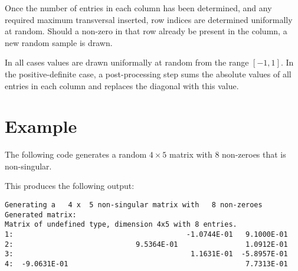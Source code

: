 Once the number of entries in each column has been determined, and any required
maximum transversal inserted, row indices are determined uniformally at random.
Should a non-zero in that row already be present in the column, a new random
sample is drawn.

In all cases values are drawn uniformally at random from the range $[-1,1]$. In
the positive-definite case, a post-processing step sums the absolute values of
all entries in each column and replaces the diagonal with this value.


\section{Example} \label{examples}

The following code generates a random $4 \times 5$ matrix with $8$ non-zeroes
that is non-singular.

This produces the following output:
\begin{verbatim}
Generating a   4 x  5 non-singular matrix with   8 non-zeroes
Generated matrix:
Matrix of undefined type, dimension 4x5 with 8 entries.
1:                                         -1.0744E-01   9.1000E-01
2:                             9.5364E-01                1.0912E-01
3:                                          1.1631E-01  -5.8957E-01
4:  -9.0631E-01                                          7.7313E-01
\end{verbatim}

\begin{funders}
\end{funders}
